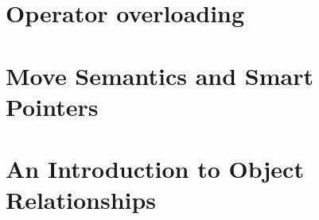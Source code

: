 \documentclass[UTF8]{ctexart}
\begin{document}

















\newpage

\section{Operator overloading}












% 

\newpage

\section{Move Semantics and Smart Pointers}










\newpage

\section{An Introduction to Object Relationships}
\end{document}
